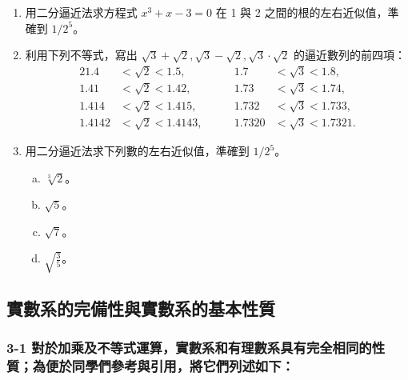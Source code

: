 \begin{enumerate}
    \item 用二分逼近法求方程式 $x^3+x-3=0$ 在 1 與 2 之間的根的左右近似值，準確到 $1/2^5$。
    \item 利用下列不等式，寫出 $\sqrt{3}+\sqrt{2}, \sqrt{3}-\sqrt{2}, \sqrt{3}\cdot\sqrt{2}$ 的逼近數列的前四項：
    \begin{alignat*}{2}
    1.4 &< \sqrt{2} < 1.5, &\qquad 1.7 &< \sqrt{3} < 1.8, \\
    1.41 &< \sqrt{2} < 1.42, &\qquad 1.73 &< \sqrt{3} < 1.74, \\
    1.414 &< \sqrt{2} < 1.415, &\qquad 1.732 &< \sqrt{3} < 1.733, \\
    1.4142 &< \sqrt{2} < 1.4143, &\qquad 1.7320 &< \sqrt{3} < 1.7321.
    \end{alignat*}
    \item 用二分逼近法求下列數的左右近似值，準確到 $1/2^5$。
    \begin{enumerate}[(a)]
        \item $\sqrt[3]{2}$。
        \item $\sqrt{5}$。
        \item $\sqrt{7}$。
        \item $\sqrt{\frac{3}{5}}$。
    \end{enumerate}
\end{enumerate}

\subsection{實數系的完備性與實數系的基本性質}\label{sec:b2_3-3}

\subsubsection*{3-1 對於加乘及不等式運算，實數系和有理數系具有完全相同的性質；為便於同學們參考與引用，將它們列述如下：}


